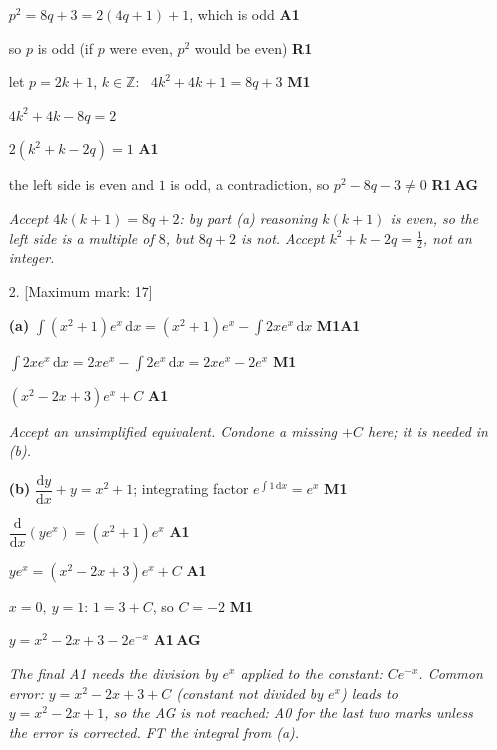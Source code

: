 \documentclass[12pt, twoside]{article}
\begin{document}
\begin{enumerate}[itemsep=0.3cm]
$p^{2} = 8q + 3 = 2(4q + 1) + 1$, which is odd \hfill \textbf{A1}

so $p$ is odd (if $p$ were even, $p^{2}$ would be even) \hfill \textbf{R1}

let $p = 2k + 1$, $k \in \mathbb{Z}$: \
$4k^{2} + 4k + 1 = 8q + 3$ \hfill \textbf{M1}

$4k^{2} + 4k - 8q = 2$

$2\left(k^{2} + k - 2q\right) = 1$ \hfill \textbf{A1}

the left side is even and $1$ is odd, a contradiction, so
$p^{2} - 8q - 3 \neq 0$ \hfill \textbf{R1}\,\textbf{AG}

\emph{Accept $4k(k + 1) = 8q + 2$: by part (a) reasoning $k(k + 1)$ is
even, so the left side is a multiple of $8$, but $8q + 2$ is not. Accept
$k^{2} + k - 2q = \frac{1}{2}$, not an integer.}

\newpage

\item[2.] [Maximum mark: 17]

\textbf{(a)} $\displaystyle\int \left(x^{2} + 1\right)e^{x}\,\mathrm{d}x
= \left(x^{2} + 1\right)e^{x} - \int 2xe^{x}\,\mathrm{d}x$ \hfill \textbf{M1A1}

$\displaystyle\int 2xe^{x}\,\mathrm{d}x = 2xe^{x} - \int 2e^{x}\,\mathrm{d}x
= 2xe^{x} - 2e^{x}$ \hfill \textbf{M1}

$\left(x^{2} - 2x + 3\right)e^{x} + C$ \hfill \textbf{A1}

\emph{Accept an unsimplified equivalent. Condone a missing $+C$ here; it
is needed in (b).}

\textbf{(b)} $\dfrac{\mathrm{d}y}{\mathrm{d}x} + y = x^{2} + 1$;
integrating factor $e^{\int 1\,\mathrm{d}x} = e^{x}$ \hfill \textbf{M1}

$\dfrac{\mathrm{d}}{\mathrm{d}x}\left(ye^{x}\right) = \left(x^{2} + 1\right)e^{x}$
\hfill \textbf{A1}

$ye^{x} = \left(x^{2} - 2x + 3\right)e^{x} + C$ \hfill \textbf{A1}

$x = 0,\ y = 1$: $1 = 3 + C$, so $C = -2$ \hfill \textbf{M1}

$y = x^{2} - 2x + 3 - 2e^{-x}$ \hfill \textbf{A1}\,\textbf{AG}

\emph{The final A1 needs the division by $e^{x}$ applied to the constant:
$Ce^{-x}$. Common error: $y = x^{2} - 2x + 3 + C$ (constant not divided
by $e^{x}$) leads to $y = x^{2} - 2x + 1$, so the AG is not reached:
A0 for the last two marks unless the error is corrected. FT the
integral from (a).}


\end{enumerate}
\end{document}
